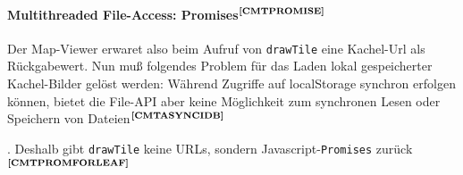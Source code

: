 \enlargethispage{2\baselineskip} %

\paragraph{Multithreaded File-Access: Promises$^{\textbf{\ref{CMTPROMISE}}}$}
\addtocounter{footnote}{1}%
Der Map-Viewer erwaret also beim Aufruf von \texttt{drawTile} eine Kachel-Url als Rückgabewert. Nun muß folgendes Problem für das Laden lokal gespeicherter Kachel-Bilder gelöst werden: Während Zugriffe auf localStorage synchron erfolgen können, bietet die File-API aber keine Möglichkeit zum synchronen Lesen oder Speichern von Dateien$^{\textbf{\ref{CMTASYNCIDB}}}$%
\addtocounter{footnote}{1}%
. Deshalb gibt \texttt{drawTile} keine URLs, sondern Javascript-\texttt{Promises} zurück$^{\textbf{\ref{CMTPROMFORLEAF}}}$%
\addtocounter{footnote}{1}%
